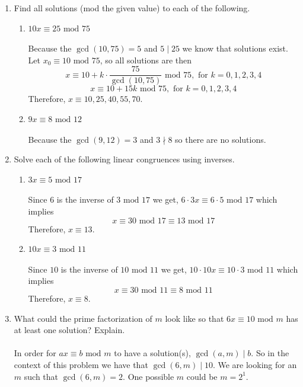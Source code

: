 \documentclass[class=article, crop=false]{standalone}
\begin{document}
\begin{enumerate}
\item
  Find all solutions (mod the given value) to each of the following.
  \begin{enumerate}
  \item $10x \equiv 25 \mbox{ mod } 75$\\\\
  Because the $\gcd(10,75)=5$ and $5\mid 25$ we know that solutions exist.
  Let $x_0 \equiv10\mbox{ mod } 75$, so all solutions are then
  $$x\equiv 10 + k \cdot \frac{75}{\gcd(10,75)}\mbox{ mod } 75,\text{ for } k=0,1,2,3,4$$
  $$x\equiv 10 + 15k\mbox{ mod } 75,\text{ for } k=0,1,2,3,4$$
  Therefore, $x\equiv 10, 25, 40, 55, 70$.

  
  \item $9x \equiv 8\mbox{ mod } 12$\\\\
  Because the $\gcd(9,12)=3$ and $3\nmid 8$ so there are no solutions.
  
  \end{enumerate}

\item
  Solve each of the following linear congruences using inverses.
  \begin{enumerate}
  \item $3x \equiv 5\mbox{ mod } 17$\\\\
  Since $6$ is the inverse of $3\mbox{ mod } 17$ we get, 
  $6\cdot3x\equiv 6\cdot 5\mbox{ mod } 17$ which implies
  $$x\equiv 30\mbox{ mod } 17\equiv 13\mbox{ mod } 17$$
  Therefore, $x\equiv 13$.

  \item $10x \equiv 3\mbox{ mod } 11$\\\\
  Since $10$ is the inverse of $10\mbox{ mod } 11$ we get,
  $10\cdot10x\equiv 10\cdot 3\mbox{ mod } 11$ which implies
  $$x\equiv 30\mbox{ mod } 11\equiv 8\mbox{ mod } 11$$
  Therefore, $x\equiv 8$.

  \end{enumerate}

\item
  What could the prime factorization of $m$ look like so that
  $6x\equiv 10\mbox{ mod } m$ has at least one solution?  Explain.\\\\
  In order for $ax\equiv b\mbox{ mod } m$ to have a solution(s),
  $\gcd(a,m)\mid b$. So in the context of this problem we have that
  $\gcd(6,m)\mid 10$. We are looking for an $m$ such that $\gcd(6,m)=2$.
  One possible $m$ could be $m=2^1$.


\end{enumerate}
\end{document}
